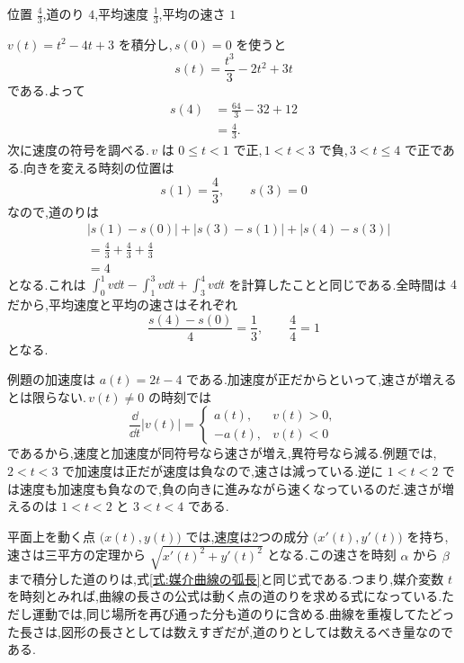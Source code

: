 位置 $\frac43$,道のり $4$,平均速度 $\frac13$,平均の速さ $1$

$v(t)=t^2-4t+3$ を積分し,\,$s(0)=0$ を使うと
\[
s(t)=\frac{t^3}{3}-2t^2+3t
\]
である.よって
\begin{align*}
s(4)&=\frac{64}{3}-32+12\\
 &=\frac43.
\end{align*}
次に速度の符号を調べる.\,$v$ は $0\le t<1$ で正,\,$1<t<3$ で負,\,$3<t\le4$ で正である.向きを変える時刻の位置は
\[
s(1)=\frac43,\qquad s(3)=0
\]
なので,道のりは
\begin{align*}
&\left|s(1)-s(0)\right|+\left|s(3)-s(1)\right|+\left|s(4)-s(3)\right|\\
&=\frac43+\frac43+\frac43\\
&=4
\end{align*}
となる.これは $\int_0^1v\dd t-\int_1^3v\dd t+\int_3^4v\dd t$ を計算したことと同じである.全時間は $4$ だから,平均速度と平均の速さはそれぞれ
\[
\frac{s(4)-s(0)}{4}=\frac13,\qquad
\frac{4}{4}=1
\]
となる.

例題の加速度は $a(t)=2t-4$ である.加速度が正だからといって,速さが増えるとは限らない.\,$v(t)\ne0$ の時刻では
\[
\frac{\dd}{\dd t}|v(t)|=
\begin{cases}
a(t),&v(t)>0,\\
-a(t),&v(t)<0
\end{cases}
\]
であるから,速度と加速度が同符号なら速さが増え,異符号なら減る.例題では,\,$2<t<3$ で加速度は正だが速度は負なので,速さは減っている.逆に $1<t<2$ では速度も加速度も負なので,負の向きに進みながら速くなっているのだ.速さが増えるのは $1<t<2$ と $3<t<4$ である.

平面上を動く点 $\bigl(x(t),y(t)\bigr)$ では,速度は2つの成分 $\bigl(x'(t),y'(t)\bigr)$ を持ち,速さは三平方の定理から $\sqrt{x'(t)^2+y'(t)^2}$ となる.この速さを時刻 $\alpha$ から $\beta$ まで積分した道のりは,式\eqref{式:媒介曲線の弧長}と同じ式である.つまり,媒介変数 $t$ を時刻とみれば,曲線の長さの公式は動く点の道のりを求める式になっている.ただし運動では,同じ場所を再び通った分も道のりに含める.曲線を重複してたどった長さは,図形の長さとしては数えすぎだが,道のりとしては数えるべき量なのである.

